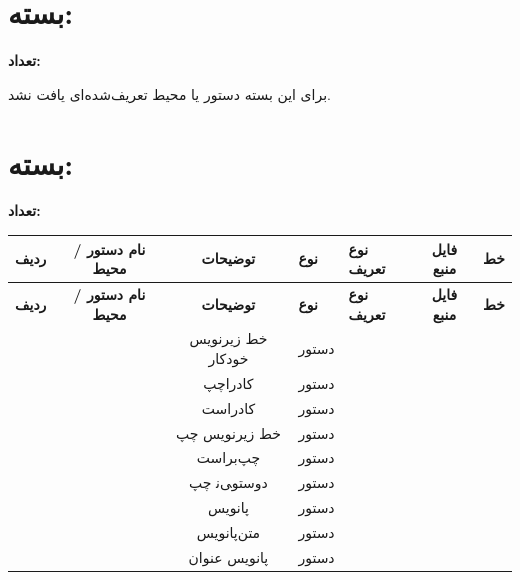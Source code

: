 \documentclass[a4paper,landscape]{article}
\begin{document}
\section*{بسته: }
\textbf{تعداد: }

برای این بسته دستور یا محیط تعریف‌شده‌ای یافت نشد.

\section*{بسته: }
\textbf{تعداد: }

\begin{xltabular}{\textwidth}{c c c l l c c}
\hline
\textbf{ردیف} & \textbf{نام دستور / محیط} & \textbf{توضیحات} & \textbf{نوع} & \textbf{نوع تعریف} & \textbf{فایل منبع} & \textbf{خط} \\
\hline
\endfirsthead
\hline
\textbf{ردیف} & \textbf{نام دستور / محیط} & \textbf{توضیحات} & \textbf{نوع} & \textbf{نوع تعریف} & \textbf{فایل منبع} & \textbf{خط} \\
\hline
\endhead
\hline
\endfoot
\hline
\endlastfoot
{} &  & ﺧﻂ ﺯﯾﺮﻧﻮﯾﺲ ﺧﻮﺩﮐﺎﺭ & دستور &  &  &  \\
 &  & ﮐﺎﺩﺭﺍﭼﭗ & دستور &  &  &  \\
 &  & ﮐﺎﺩﺭﺍﺳﺖ & دستور &  &  &  \\
 &  & ﺧﻂ ﺯﯾﺮﻧﻮﯾﺲ ﭼﭗ & دستور &  &  &  \\
 &  & ﭼﭗﺑﺮﺍﺳﺖ & دستور &  &  &  \\
 &  & ﺩﻭﺳﺘﻮﯽﻧ ﭼﭗ & دستور &  &  &  \\
 &  & ﭘﺎﻧﻮﯾﺲ & دستور &  &  &  \\
 &  & ﻣﺘﻦﭘﺎﻧﻮﯾﺲ & دستور &  &  &  \\
 &  & ﭘﺎﻧﻮﯾﺲ ﻋﻨﻮﺍﻥ & دستور &  &  &  \\

\end{xltabular}
\end{document}
